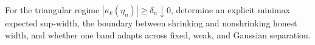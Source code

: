 For the triangular regime \(|\kappa_k(\eta_n)|\ge\delta_n\downarrow0\), determine an explicit minimax expected sup-width, the boundary between shrinking and nonshrinking honest width, and whether one band adapts across fixed, weak, and Gaussian separation.